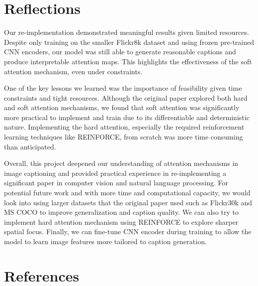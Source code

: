 \documentclass{article}
\begin{document}
\section{Reflections}


Our re-implementation demonstrated meaningful results given limited resources. Despite only training on the smaller Flickr8k dataset and using frozen pre-trained CNN encoders, our model was still able to generate reasonable captions and produce interpretable attention maps. This highlights the effectiveness of the soft attention mechanism, even under constraints.

One of the key lessons we learned was the importance of feasibility given time constraints and tight resources. Although the original paper explored both hard and soft attention mechanisms, we found that soft attention was significantly more practical to implement and train due to its differentiable and deterministic nature. Implementing the hard attention, especially the required reinforcement learning techniques like REINFORCE, from scratch was more time consuming than anticipated.

Overall, this project deepened our understanding of attention mechanisms in image captioning and provided practical experience in re-implementing a significant paper in computer vision and natural language processing. For potential future work and with more time and computational capacity, we would look into using larger datasets that the original paper used such as Flickr30k and MS COCO to improve generalization and caption quality. We can also try to implement hard attention mechanism using REINFORCE to explore sharper spatial focus. Finally, we can fine-tune CNN encoder during training to allow the model to learn image features more tailored to caption generation.


\section{References}
\end{document}
